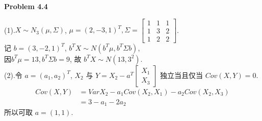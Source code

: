 \documentclass[UTF8,12pt]{article}
\newenvironment{problem}[2][Problem]
{ \begin{mdframed}[backgroundcolor=gray!20] \textbf{#1 #2}}
	{  \end{mdframed}}
\newenvironment{answer}
{}
{}
\newenvironment{eq}
{
	\begin{equation}
		\begin{aligned}\nonumber
}
{
		\end{aligned}
	\end{equation}
}
\begin{document}
\renewcommand{\qed}{\quad\qedsymbol}
\begin{problem}{4.4}
\end{problem}
\begin{answer}
(1).$X\sim N_3(\mu, \Sigma)$, $\mu = (2, -3, 1)^T, \Sigma = 
\begin{bmatrix}
    1 & 1 & 1 \\
    1 & 3 & 2 \\
    1 & 2 & 2
    \end{bmatrix}
$.\\
记 $b=(3,-2,1)^T$, $b^TX\sim N(b^T\mu, b^T\Sigma b)$, \\
因$b^T\mu=13,b^T\Sigma b=9$, 故 $b^T X\sim N(13,3^2)$.\\
(2).令 $a=(a_1, a_2)^T$, $X_2$ 与 $Y=X_2 - a^T
\begin{bmatrix}
    X_1 \\
    X_3 
\end{bmatrix}
$ 独立当且仅当 $Cov(X, Y)=0$.\\
\begin{eq}
	Cov(X, Y)&= Var X_2 - a_1 Cov(X_2,X_1) -a_2Cov(X_2, X_3)\\
	&= 3 - a_1 -2 a_2
\end{eq}
所以可取 $a = (1,1)$.
\end{answer}
\end{document}
